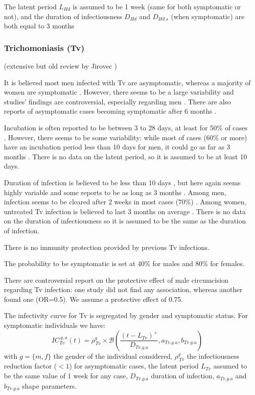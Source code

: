 \documentclass[11pt, onecolumn]{article}
\begin{document}
The latent period $L_{Hd}$ is assumed to be 1 week (same for both symptomatic or not), and the duration of infectiousness $D_{Hd}$ and $D_{Hd.s}$ (when symptomatic) are both equal to 3 months


\subsubsection{Trichomoniasis (Tv)}

(extensive but old review by Jirovec \cite{Jirovec:1968vi})

It is believed most men infected with Tv are asymptomatic, whereas a majority of women are symptomatic \cite{Pellicane:2011dk,Schwebke:2004bq}. However, there seems to be a large variability and studies' findings are controversial, especially regarding men \cite{Krieger:1995ur}. There are also reports of asymptomatic cases becoming symptomatic after 6 months \cite{Petrin:1998te}.

Incubation is often reported to be between 3 to 28 days, at least for 50\% of cases \cite{Petrin:1998te}. However, there seems to be some variability: while most of cases (60\% or more) have an incubation period less than 10 days for men, it could go as far as 3 months \cite{Krieger:1995ur}. There is no data on the latent period, so it is assumed to be at least 10 days.

Duration of infection is believed to be less than 10 days \cite{Petrin:1998te}, but here again seems highly variable and some reports to be as long as 3 months \cite{Krieger:1995ur}. Among men, infection seems to be cleared after 2 weeks in most cases (70\%) \cite{Krieger:1995ur}. Among women, untreated Tv infection is believed to last 3 months on average \cite{Pellicane:2011dk}.
There is no data on the duration of infectiousness so it is assumed to be the same as the duration of infection.


There is no immunity protection provided by previous Tv infections.

The probability to be symptomatic is set at 40\% for males and 80\% for females.

There are controversial report on the protective effect of male circumcision regarding Tv infection: one study \cite{Mehta:2009bh} did not find any association, whereas another \cite{SobngwiTambekou:2008fs} found one (OR=0.5). We assume a protective effect of 0.75. 

The infectivity curve for Tv is segregated by gender and symptomatic status. For symptomatic individuals we have:
$$IC_{Tv}^{\,g,a}(t) =  \rho_{\,Tv}^g \times\mathcal{B}\left(\frac{(t-L_{Tv})^+}{D_{Tv.g.a}},a_{Tv.g.a},b_{Tv.g.a}\right)  $$
with $g=\{m,f\}$ the gender of the individual considered, $\rho_{\,Tv}^g$ the infectiousness reduction factor ($<1$) for asymptomatic cases, the latent period $L_{Tv}$ assumed to be the same value of 1 week for any case, $D_{Tv.g.a}$ duration of infection, $a_{Tv.g.a}$ and $b_{Tv.g.a}$ shape parameters. 
\end{document}

